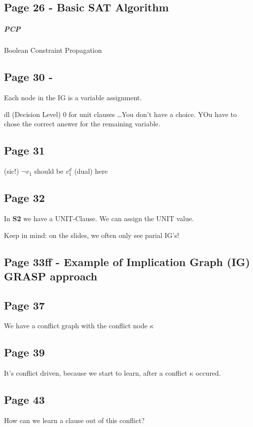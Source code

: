 \documentclass[a4paper]{article}
\newcommand{\tb}[1]{\textbf{#1}}
\begin{document}
\subsection{Page 26 - Basic SAT Algorithm}

\subparagraph{PCP} Boolean Constraint Propagation

\subsection{Page 30 - }
Each node in the IG is a variable assignment.

dl (Decision Level) 0 for unit clauses \ldots You don't have a choice. YOu have
to chose the correct answer for the remaining variable.


\subsection{Page 31}

(sic!) $\neg v_1$ should be $ v_{1}^d $ (dual) here

\subsection{Page 32}
In \tb{S2} we have a UNIT-Clause. We can assign the UNIT value.

Keep in mind: on the slides, we often only see parial IG's!

\subsection{Page 33ff - Example of Implication Graph (IG) GRASP approach}

\subsection{Page 37}
We have a conflict graph with the conflict node $\kappa$

\subsection{Page 39}
It's conflict driven, because we start to learn, after a conflict $\kappa $
occured.

\subsection{Page 43}
How can we learn a clause out of this conflict?
\end{document}
